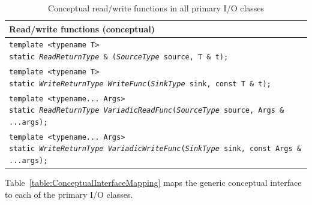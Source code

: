 \begin{table}[H]
\begin{tabular}{l}
  \textbf{Read/write functions (conceptual)} \\ \hline
  \makecell[l]{\texttt{template <typename T>}\\ \texttt{static \textit{\color{red1}ReadReturnType} \& \color{darkblue}{\textit{ReadFunc}}(\textit{\color{green1}SourceType} {\color{green1}source}, T \& t);}} \\
  \makecell[l]{\texttt{template <typename T>}\\ \texttt{static \textit{\color{red1}WriteReturnType} \textit{\color{darkblue}WriteFunc}(\textit{\color{green1}SinkType} {\color{green1}sink}, const T \& t);}} \\
  \makecell[l]{\texttt{template <typename... Args>}\\ \texttt{static \textit{\color{red1}ReadReturnType} \textit{\color{darkblue}VariadicReadFunc}(\textit{\color{green1}SourceType} {\color{green1}source}, Args \& ...args);}} \\
  \makecell[l]{\texttt{template <typename... Args>}\\ \texttt{static \textit{\color{red1}WriteReturnType} \textit{\color{darkblue}VariadicWriteFunc}(\textit{\color{green1}SinkType} {\color{green1}sink}, const Args \& ...args);}} \\
\end{tabular}
\caption{Conceptual read/write functions in all primary I/O classes}
\label{table:ConceptualInterfaceGeneric}
\end{table}

Table~\ref{table:ConceptualInterfaceMapping} maps the generic conceptual
interface to each of the primary I/O classes.

